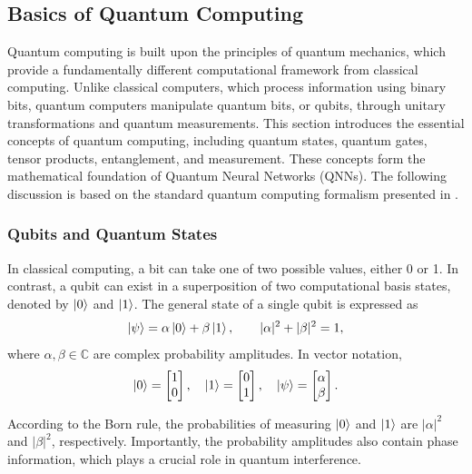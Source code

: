 \documentclass[12pt]{article}
\numberwithin{equation}{section}  %
\begin{document}
\subsection{Basics of Quantum Computing}


Quantum computing is built upon the principles of quantum mechanics, which provide a fundamentally different computational framework from classical computing. Unlike classical computers, which process information using binary bits, quantum computers manipulate quantum bits, or qubits, through unitary transformations and quantum measurements. This section introduces the essential concepts of quantum computing, including quantum states, quantum gates, tensor products, entanglement, and measurement. These concepts form the mathematical foundation of Quantum Neural Networks (QNNs). The following discussion is based on the standard quantum computing formalism presented in \cite[Chaps.~2 and~4]{nielsen2010quantum}.

\subsubsection{Qubits and Quantum States}

In classical computing, a bit can take one of two possible values, either 0 or 1. In contrast, a qubit can exist in a superposition of two computational basis states, denoted by $\ket{0}$ and $\ket{1}$. The general state of a single qubit is expressed as
\begin{equation}
    \ket{\psi}=\alpha\ket{0}+\beta\ket{1},
    \qquad |\alpha|^2+|\beta|^2=1,
    \label{eq:qubit_state}
\end{equation}
where $\alpha,\beta\in\mathbb{C}$ are complex probability amplitudes. In vector notation,
\begin{equation}
    \ket{0}=
    \begin{bmatrix}1\\0\end{bmatrix},
    \quad
    \ket{1}=
    \begin{bmatrix}0\\1\end{bmatrix},
    \quad
    \ket{\psi}=
    \begin{bmatrix}\alpha\\\beta\end{bmatrix}.
\end{equation}

According to the Born rule, the probabilities of measuring $\ket{0}$ and $\ket{1}$ are $|\alpha|^2$ and $|\beta|^2$, respectively. Importantly, the probability amplitudes also contain phase information, which plays a crucial role in quantum interference.
\end{document}
